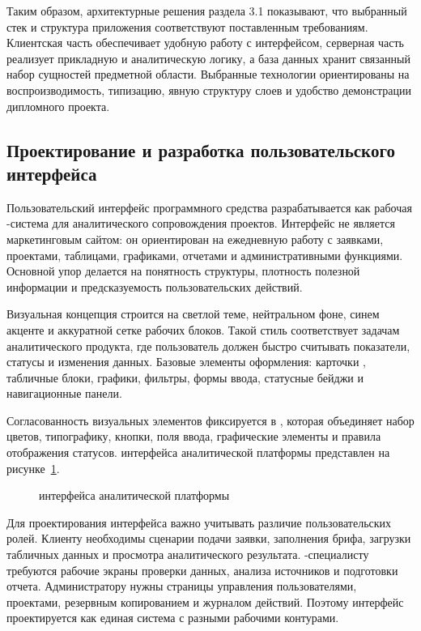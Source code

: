 Таким образом, архитектурные решения раздела 3.1 показывают, что выбранный стек и структура приложения соответствуют поставленным требованиям. Клиентская часть обеспечивает удобную работу с интерфейсом, серверная часть реализует прикладную и аналитическую логику, а база данных хранит связанный набор сущностей предметной области. Выбранные технологии ориентированы на воспроизводимость, типизацию, явную структуру слоев и удобство демонстрации дипломного проекта.

\subsection{Проектирование и разработка пользовательского интерфейса}

Пользовательский интерфейс программного средства разрабатывается как рабочая -система для аналитического сопровождения  проектов. Интерфейс не является маркетинговым сайтом: он ориентирован на ежедневную работу с заявками, проектами, таблицами, графиками, отчетами и административными функциями. Основной упор делается на понятность структуры, плотность полезной информации и предсказуемость пользовательских действий.

Визуальная концепция строится на светлой теме, нейтральном фоне, синем акценте и аккуратной сетке рабочих блоков. Такой стиль соответствует задачам аналитического продукта, где пользователь должен быстро считывать показатели, статусы и изменения данных. Базовые элементы оформления: карточки , табличные блоки, графики, фильтры, формы ввода, статусные бейджи и навигационные панели.

Согласованность визуальных элементов фиксируется в , которая объединяет набор цветов, типографику, кнопки, поля ввода, графические элементы и правила отображения статусов.  интерфейса аналитической платформы представлен на рисунке~\ref{fig:design-system}.

\begin{figure}[H]
    \centering
    \caption{ интерфейса аналитической платформы}
    \label{fig:design-system}
\end{figure}

Для проектирования интерфейса важно учитывать различие пользовательских ролей. Клиенту необходимы сценарии подачи заявки, заполнения брифа, загрузки табличных данных и просмотра аналитического результата. -специалисту требуются рабочие экраны проверки данных, анализа источников и подготовки отчета. Администратору нужны страницы управления пользователями, проектами, резервным копированием и журналом действий. Поэтому интерфейс проектируется как единая система с разными рабочими контурами.

